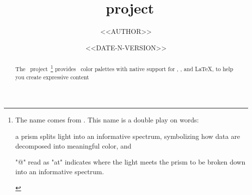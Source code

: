 \documentclass{tutodoc}
\begin{document}
\title{\thisproj*\ project}
\author{<<AUTHOR>>}
\date{<<DATE-N-VERSION>>}

\maketitle

\begin{abstract}
    The \thisproj\ project\,%
    \footnote{
        The name comes from .
        This name is a double play on words:\kern3pt%
        \begin{enumerate*}[label={[\arabic*]}]
            \item a prism splits light into an informative spectrum, symbolizing how data are decomposed into meaningful color,
            and
            \item "@" read as "at" indicates where the light meets the prism to be broken down into an informative spectrum.
        \end{enumerate*}
    }
    provides \nbOfPals\ color palettes with native support for \css, \lua, and \LaTeX, to help you create expressive content

%
\end{abstract}
\end{document}
